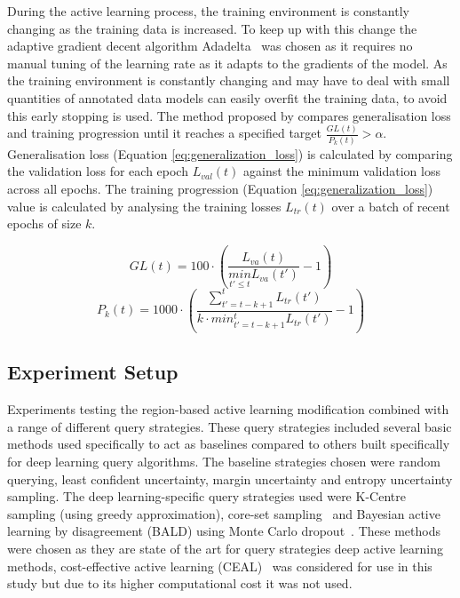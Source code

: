 During the active learning process, the training environment is constantly changing as the training data is increased. To keep up with this change the adaptive gradient decent algorithm Adadelta~\citep{zeiler2012adadelta} was chosen as it requires no manual tuning of the learning rate as it adapts to the gradients of the model. As the training environment is constantly changing and may have to deal with small quantities of annotated data models can easily overfit the training data, to avoid this early stopping is used. The method proposed by \cite{prechelt1998early} compares generalisation loss and training progression until it reaches a specified target $\frac{GL(t)}{P_k(t)} > \alpha$. Generalisation loss (Equation \ref{eq:generalization_loss}) is calculated by comparing the validation loss for each epoch \(L_{val}(t)\) against the minimum validation loss across all epochs. The training progression (Equation \ref{eq:generalization_loss}) value is calculated by analysing the training losses \(L_{tr}(t)\) over a batch of recent epochs of size \(k\).

\begin{equation}
	GL(t) = 100 \cdot \left ( \frac{L_{va}(t)}{\underset{t'\leq t}{min}L_{va}(t')} - 1 \right )
	\label{eq:generalization_loss}
\end{equation}
\begin{equation}
	P_k(t) = 1000 \cdot \left ( \frac{\sum_{t'=t-k+1}^{t}L_{tr}(t')}{k \cdot min^{t}_{t'=t-k+1}L_{tr}(t')} - 1\right )
	\label{eq:training_progression}
\end{equation}

\subsection{Experiment Setup}
Experiments testing the region-based active learning modification combined with a range of different query strategies. These query strategies included several basic methods used specifically to act as baselines compared to others built specifically for deep learning query algorithms. The baseline strategies chosen were random querying, least confident uncertainty, margin uncertainty and entropy uncertainty sampling. The deep learning-specific query strategies used were K-Centre sampling (using greedy approximation), core-set sampling~\citep{sener2017active} and Bayesian active learning by disagreement (BALD) using Monte Carlo dropout~\citep{gal2017deep}. These methods were chosen as they are state of the art for query strategies deep active learning methods, cost-effective active learning (CEAL)~\citep{wang2016cost} was considered for use in this study but due to its higher computational cost it was not used.

